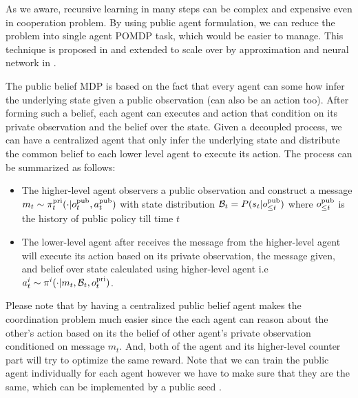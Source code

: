 \label{sec:chap5-pub-belief-MDP}
As we aware, recursive learning in many steps can be complex and expensive even in cooperation problem. By using public agent formulation, we can reduce the problem into single agent POMDP task, which would be easier to manage. This technique is proposed in \cite{nayyar2013decentralized} and extended to scale over by approximation and neural network in \cite{foerster2018bayesian}. 

The public belief MDP is based on the fact that every agent can some how infer the underlying state given a public observation (can also be an action too). After forming such a belief, each agent can executes and action that condition on its private observation and the belief over the state. Given a decoupled process, we can have a centralized agent that only infer the underlying state and distribute the common belief to each lower level agent to execute its action. The process can be summarized as follows:
\begin{itemize}
    \item The higher-level agent observers a public observation and construct a message $m_t \sim \pi^{\operatorname{pri}}_t(\cdot | o^{\operatorname{pub}}_t, a^{\operatorname{pub}}_t)$ with state distribution $\mathcal{B}_t = P(s_t | o^{\operatorname{pub}}_{\le t})$ where $o^{\operatorname{pub}}_{\le t}$ is the history of public policy till time $t$
    \item The lower-level agent after receives the message from the higher-level agent will execute its action based on its private observation, the message given, and belief over state calculated using higher-level agent i.e $a^i_t \sim \pi^i(\cdot | m_t, \mathcal{B}_t, o^{\operatorname{pri}}_t)$. 
\end{itemize}
Please note that by having a centralized public belief agent makes the coordination problem much easier since the each agent can reason about the other's action based on its the belief of other agent's private observation conditioned on message $m_t$. And, both of the agent and its higher-level counter part will try to optimize the same reward. Note that we can train the public agent individually for each agent however we have to make sure that they are the same, which can be implemented by a public seed \cite{foerster2018bayesian}.